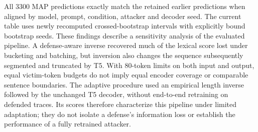 \documentclass[electronics,article,submit,pdftex,moreauthors]{Definitions/mdpi}
\begin{document}
All 3300 MAP predictions exactly match the retained earlier predictions when aligned by model, prompt, condition, attacker and decoder seed. The current table uses newly recomputed crossed-bootstrap intervals with explicitly bound bootstrap seeds. These findings describe a sensitivity analysis of the evaluated pipeline. A defense-aware inverse recovered much of the lexical score lost under bucketing and batching, but inversion also changes the sequence subsequently segmented and truncated by T5. With 80-token limits on both input and output, equal victim-token budgets do not imply equal encoder coverage or comparable sentence boundaries. The adaptive procedure used an empirical length inverse followed by the unchanged T5 decoder, without end-to-end retraining on defended traces. Its scores therefore characterize this pipeline under limited adaptation; they do not isolate a defense's information loss or establish the performance of a fully retrained attacker.
\end{document}
